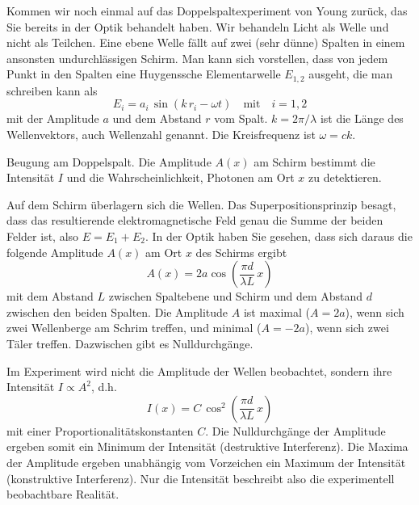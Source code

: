 Kommen wir noch einmal auf das Doppelspaltexperiment von Young zurück, das Sie bereits in der Optik behandelt haben. Wir behandeln Licht als Welle und nicht als Teilchen. Eine ebene Welle fällt auf zwei (sehr dünne) Spalten in einem ansonsten undurchlässigen Schirm. Man kann sich vorstellen, dass von jedem Punkt in den Spalten eine Huygenssche Elementarwelle $E_{1,2}$ ausgeht, die man schreiben kann als 
\begin{equation}
    E_{i} = a_i \, \sin ( k \, r_i - \omega t) \quad \text{mit} \quad i = 1,2
\end{equation}
mit der Amplitude $a$ und dem Abstand $r$ vom Spalt. $k = 2 \pi / \lambda $ ist die Länge des Wellenvektors, auch Wellenzahl genannt.
Die Kreisfrequenz ist $\omega = c k$.


\begin{marginfigure}
    \caption{Beugung am Doppelspalt. Die Amplitude $A(x)$ am Schirm bestimmt die Intensität $I$ und die Wahrscheinlichkeit, Photonen am Ort $x$ zu detektieren.}
    \label{fig:3_Doppelspalt}
\end{marginfigure}


Auf dem Schirm überlagern sich die Wellen. Das Superpositionsprinzip besagt, dass das resultierende elektromagnetische Feld genau die Summe der beiden Felder ist, also $E = E_1 + E_2$. In der Optik haben Sie gesehen, dass sich daraus die folgende Amplitude $A(x)$ am Ort $x$ des Schirms ergibt
\begin{equation}
    A(x) = 2 a\cos \left( \frac{\pi d}{\lambda L} \, x \right)
\end{equation}
mit dem Abstand $L$ zwischen Spaltebene und Schirm und dem Abstand $d$ zwischen den beiden Spalten. Die Amplitude $A$ ist maximal ($A = 2a$), wenn sich zwei Wellenberge am Schrim treffen, und minimal ($A = -2 a$), wenn sich zwei Täler treffen.  Dazwischen gibt es Nulldurchgänge. 

Im Experiment wird nicht die Amplitude der Wellen beobachtet, sondern ihre Intensität $I \propto A^2$, d.h.
\begin{equation}
    I(x) = C \, \cos^2 \left( \frac{\pi d}{\lambda L} \, x \right)
\end{equation}
mit einer Proportionalitätskonstanten $C$. Die Nulldurchgänge der Amplitude ergeben somit ein Minimum der Intensität (destruktive Interferenz). Die Maxima der Amplitude ergeben unabhängig vom Vorzeichen ein Maximum der Intensität (konstruktive Interferenz). Nur die Intensität beschreibt also die experimentell beobachtbare Realität.


